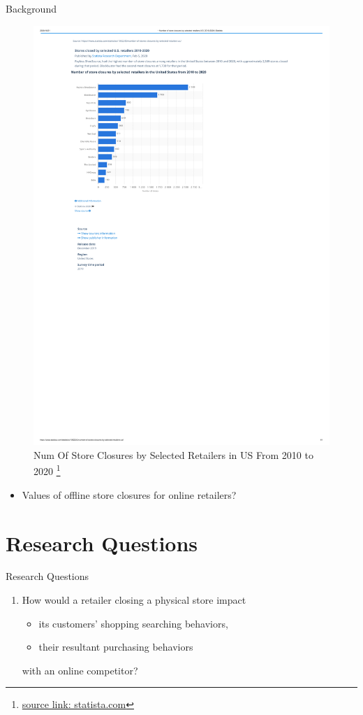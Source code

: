 \documentclass[mathserif, xcolor=table]{beamer}
\begin{document}
\begin{frame}[allowframebreaks]{Background}
\begin{figure}[h]
		\includegraphics[scale=0.3]{pic/retail_closure.pdf}
		\caption{Num Of Store Closures by Selected Retailers in US From 2010 to 2020 \footnote{\href{https://www.statista.com/statistics/1092243/number-of-stores-closures-by-selected-retailers-us/}{source link: statista.com}}}
	\end{figure}
	\begin{itemize}
		\item Values of offline store closures for online retailers?
	\end{itemize}
\end{frame}

\section{Research Questions}
\begin{frame}{Research Questions}
	\begin{enumerate}
		\item How would a retailer closing a physical store impact
		\begin{itemize}
			\item its customers’ shopping searching behaviors, 
			\item their resultant purchasing behaviors
		\end{itemize}
	 with an online competitor?
	\end{enumerate}
\end{frame}
\end{document}
